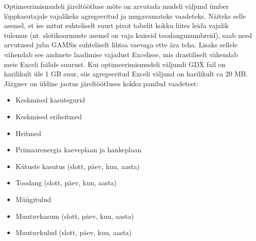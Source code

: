 Optimeerimismudeli järeltöötluse mõte on arvutada mudeli väljund ümber lõppkasutajale vajalikeks agregeeritud ja mugavamateks vaadeteks. Näiteks selle asemel, et ise mitut suhteliselt suurt pivot  tabelit kokku liites leida vajalik tulemus (nt. slotikoormuste asemel on vaja kuiseid toodangunumbreid), saab need arvutused juba GAMSis suhteliselt lihtsa vaevaga ette ära teha. Lisaks sellele vähendab see andmete laadimise vajadust Excelisse, mis drastiliselt vähendab meie Exceli failide suurust.   Kui optimeerimismudeli väljundi GDX fail on harilikult üle 1 GB suur, siis agregeeritud Exceli väljund on harilikult ca 20 MB. Järgnev on üldine jaotus järeltöötluses kokku pandud vaadetest:
\begin{itemize}
\item Keskmised kasutegurid
\item Keskmised eriheitmed
\item Heitmed
\item Primaarenergia kaeveplaan ja hankeplaan
\item Kütuste kasutus (slott, päev, kuu, aasta)
\item Toodang (slott, päev, kuu, aasta)
\item Müügitulud
\item Muutuvkasum (slott, päev, kuu, aasta)
\item Muutuvkulud (slott, päev, kuu, aasta)
\end{itemize}